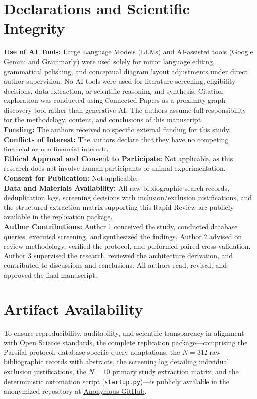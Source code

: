 \documentclass[sigconf, anonymous, balance=false]{acmart}
\begin{document}
\section*{Declarations and Scientific Integrity}
\label{sec:declarations}

\textbf{Use of AI Tools:} Large Language Models (LLMs) and AI-assisted tools (Google Gemini and Grammarly) were used solely for minor language editing, grammatical polishing, and conceptual diagram layout adjustments under direct author supervision. No AI tools were used for literature screening, eligibility decisions, data extraction, or scientific reasoning and synthesis. Citation exploration was conducted using Connected Papers as a proximity graph discovery tool rather than generative AI. The authors assume full responsibility for the methodology, content, and conclusions of this manuscript. \\
\textbf{Funding:} The authors received no specific external funding for this study. \\
\textbf{Conflicts of Interest:} The authors declare that they have no competing financial or non-financial interests. \\
\textbf{Ethical Approval and Consent to Participate:} Not applicable, as this research does not involve human participants or animal experimentation. \\
\textbf{Consent for Publication:} Not applicable. \\
\textbf{Data and Materials Availability:} All raw bibliographic search records, deduplication logs, screening decisions with inclusion/exclusion justifications, and the structured extraction matrix supporting this Rapid Review are publicly available in the replication package. \\
\textbf{Author Contributions:} Author 1 conceived the study, conducted database queries, executed screening, and synthesized the findings. Author 2 advised on review methodology, verified the protocol, and performed paired cross-validation. Author 3 supervised the research, reviewed the architecture derivation, and contributed to discussions and conclusions. All authors read, revised, and approved the final manuscript.

\section*{Artifact Availability}
To ensure reproducibility, auditability, and scientific transparency in alignment with Open Science standards, the complete replication package—comprising the Parsifal protocol, database-specific query adaptations, the $N = 312$ raw bibliographic records with abstracts, the screening log detailing individual exclusion justifications, the $N = 10$ primary study extraction matrix, and the deterministic automation script (\texttt{startup.py})—is publicly available in the anonymized repository at \href{https://anonymous.4open.science/r/observability-rapid-review-paper}{Anonymous GitHub}.



\end{document}
